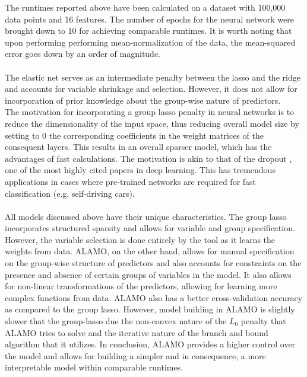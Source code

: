 \documentclass[a4paper,12pt]{article}
\begin{document}
The runtimes reported above have been calculated on a dataset with 100,000 data points and 16 features. The number of epochs for the neural network were brought down to 10 for achieving comparable runtimes. It is worth noting that upon performing performing mean-normalization of the data, the mean-squared error goes down by an order of magnitude. \\
\\The elastic net serves as an intermediate penalty between the lasso and the ridge and accounts for variable shrinkage and selection. However, it does not allow for incorporation of prior knowledge about the group-wise nature of predictors. \\The motivation for incorporating a group lasso penalty in neural networks is to reduce the dimensionality of the input space, thus reducing overall model size by setting to 0 the corresponding coefficients in the weight matrices of the consequent layers. This results in an overall sparser model, which has the advantages of fast calculations.
The motivation is akin to that of the dropout \autocite{srivastava2014dropout}, one of the most highly cited papers in deep learning.  This has tremendous applications in cases where pre-trained networks are required for fast classification (e.g. self-driving cars).\\\\
All models discussed above have their unique characteristics. The group lasso incorporates structured sparsity and allows for variable and group specification. However, the variable selection is done entirely by the tool as it learns the weights from data. ALAMO, on the other hand, allows for manual specification on the group-wise structure of predictors and also accounts for constraints on the presence and absence of certain groups of variables in the model. It also allows for non-linear transformations of the predictors, allowing for learning more complex functions from data. ALAMO also has a better cross-validation accuracy as compared to the group lasso. However, model building in ALAMO is slightly slower that the group-lasso due the non-convex nature of the $L_0$ penalty that ALAMO tries to solve and the iterative nature of the branch and bound algorithm that it utilizes. In conclusion, ALAMO provides a higher control over the model and allows for building a simpler and in consequence, a more interpretable model within comparable runtimes.

\newpage

%  
% 

\printbibliography
\end{document}
